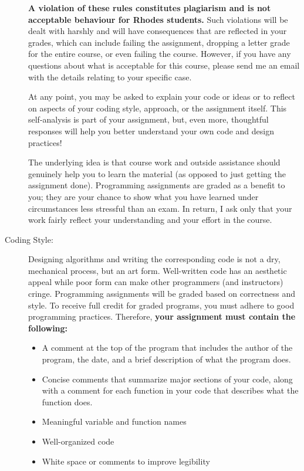 \documentclass [letterpaper,11pt]{article}
\begin{document}
\begin{description}
\textbf{A violation of these rules constitutes plagiarism and is not acceptable behaviour for Rhodes
students.} Such violations will be dealt with harshly and will have consequences that are
reflected in your grades, which can include failing the assignment, dropping a letter grade for
the entire course, or even failing the course. However, if you have any questions about what
is acceptable for this course, please send me an email with the details relating to your specific
case.

At any point, you may be asked to explain your code or ideas or to reflect on aspects of your
coding style, approach, or the assignment itself. This self-analysis is part of your assignment,
but, even more, thoughtful responses will help you better understand your own code and
design practices!

The underlying idea is that course work and outside assistance should genuinely help you to
learn the material (as opposed to just getting the assignment done). Programming assignments
are graded as a benefit to you; they are your chance to show what you have learned
under circumstances less stressful than an exam. In return, I ask only that your work fairly
reflect your understanding and your effort in the course.

\item[Coding Style:]
Designing algorithms and writing the corresponding code is not a dry, mechanical process, but an art form.  Well-written code has an aesthetic appeal while poor form can make other programmers (and instructors) cringe. Programming assignments will be graded based on correctness and style. To receive full credit for graded programs, you must adhere to good programming practices. Therefore, \textbf{your assignment must contain the following:}
\begin{itemize}\setlength{\itemsep}{0em}\setlength{\parskip}{0pt}
	\item A comment at the top of the program that includes the author of the program,
	the date, and a brief description of what the program does.
	\item Concise comments that summarize major sections of your code, along with a comment
	for each function in your code that describes what the function does.
	\item Meaningful variable and function names
	\item Well-organized code
	\item White space or comments to improve legibility
\end{itemize}



\end{description}
\end{document}
